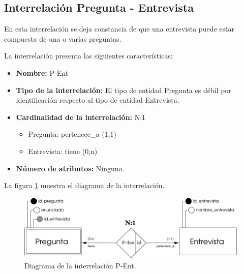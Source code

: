 \subsection{Interrelación Pregunta - Entrevista}

   \begin{description}
      \item[Definición] En esta interrelación se deja constancia de que una
      entrevista puede estar compuesta de una o varias preguntas.

      \item[Características] La interrelación presenta las siguientes
                             características:

         \begin{itemize}
            \item \textbf{Nombre:} P-Ent
            \item \textbf{Tipo de la interrelación:} El tipo de entidad Pregunta
            es débil por identificación respecto al tipo de entidad Entrevista.
            \item \textbf{Cardinalidad de la interrelación:} N:1
                  \begin{itemize}
                     \item Pregunta: pertenece\_a (1,1)
                     \item Entrevista: tiene (0,n)
                  \end{itemize}
            \item \textbf{Número de atributos:} Ninguno.
         \end{itemize}

      \item[Diagrama] La figura \ref{diagramaP-Ent} muestra el diagrama de la
                      interrelación.

      \item \begin{figure}[!ht]
            \begin{center}
            \includegraphics[]{07.Modelo_Entidad-Interrelacion/7.3.Analisis_Interrelaciones/diagramas/P-Ent.pdf}
            \caption{Diagrama de la interrelación P-Ent.}
            \label{diagramaP-Ent}
            \end{center}
         \end{figure}


\end{description}
